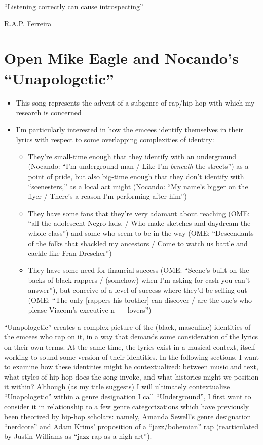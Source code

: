 \onehalfspacing

\epigraph{{``Listening correctly can cause introspecting''}}{R.A.P. Ferreira}

\section{Open Mike Eagle and Nocando's ``Unapologetic''}


\begin{itemize}
    \item This song represents the advent of a subgenre of rap/hip-hop with which my research is concerned
    \item I'm particularly interested in how the emcees identify themselves in their lyrics with respect to some 
    overlapping complexities of identity:
          \begin{itemize}
                \item They're small-time enough that they identify with an underground (Nocando: ``I'm underground man / Like 
                I'm  \emph{beneath} the streets'') as a point of pride, but also big-time enough that they don't identify with 
                ``scenesters,'' as a local act might (Nocando: ``My name's bigger on the flyer / There's a reason I'm performing
                after him'')
                \item They have some fans that they're very adamant about reaching (OME: ``all the adolescent Negro lads, / Who make 
                sketches and daydream the whole class'') and some who seem to be in the way (OME: ``Descendants of the folks that 
                shackled my ancestors / Come to watch us battle and cackle like Fran Drescher'')
                \item They have some need for financial success (OME: ``Scene's built on the backs of black rappers / (somehow) when
                I'm asking for cash you can't answer''), but conceive of a level of success where they'd be selling out (OME: ``The 
                only [rappers his brother] can discover / are the one's who please Viacom's executive n----- lovers'')
          \end{itemize}
\end{itemize}

``Unapologetic'' creates a complex picture of the (black, masculine) identities of the emcees who rap on it, in a way 
that demands some consideration of the lyrics on their own terms. At the same time, the lyrics exist in a musical context,
itself working to sound some version of their identities. In the following sections, I want to examine how these identities
might be contextualized: between music and text, what styles of hip-hop does the song invoke, and what histories might
we position it within? Although (as my title suggests) I will ultimately contextualize ``Unapologetic'' within a genre 
designation I call ``Underground'', I first want to consider it in relationship to a few genre categorizations which
have previously been theorized by hip-hop scholars: namely, Amanda Sewell's genre designation ``nerdcore'' and Adam Krims'
proposition of a ``jazz/bohemian'' rap (rearticulated by Justin Williams as ``jazz rap as a high art'').

